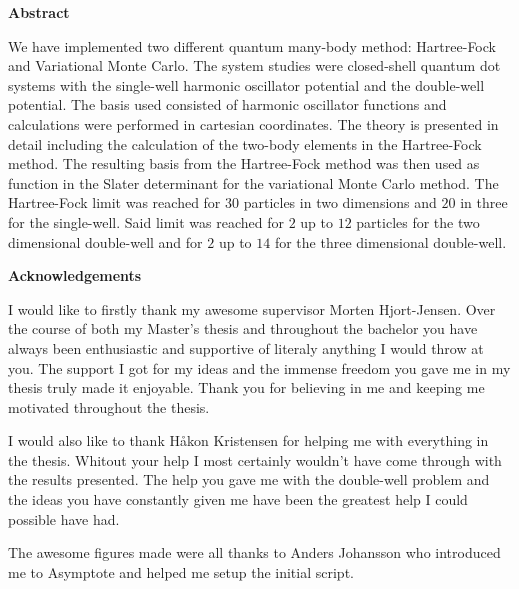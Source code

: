 \newpage
\begin{center}
    \textbf{\Large{Abstract}}\\ \vspace{0.6cm}
\end{center}
    We have implemented two different quantum many-body method: Hartree-Fock
    and Variational Monte Carlo. The system studies were closed-shell quantum
    dot systems with the single-well harmonic oscillator potential and the
    double-well potential. The basis used consisted of harmonic oscillator
    functions and calculations were performed in cartesian coordinates. The
    theory is presented in detail including the calculation of the two-body
    elements in the Hartree-Fock method. The resulting basis from the
    Hartree-Fock method was then used as function in the Slater determinant for
    the variational Monte Carlo method. The Hartree-Fock limit was reached for
    $30$ particles in two dimensions and $20$ in three for the single-well.
    Said limit was reached for $2$ up to $12$ particles for the two dimensional
    double-well and for $2$ up to $14$ for the three dimensional double-well.

\thispagestyle{empty}
\clearpage

\thispagestyle{empty}
\clearpage

\begin{center}
    \textbf{\Large{Acknowledgements}}\\ \vspace{0.6cm}
\end{center}
    I would like to firstly thank my awesome supervisor Morten Hjort-Jensen.
    Over the course of both my Master's thesis and throughout the bachelor you
    have always been enthusiastic and supportive of literaly anything I would
    throw at you. The support I got for my ideas and the immense freedom you
    gave me in my thesis truly made it enjoyable. Thank you for believing in me
    and keeping me motivated throughout the thesis.

    I would also like to thank Håkon Kristensen for helping me with everything
    in the thesis. Whitout your help I most certainly wouldn't have come
    through with the results presented. The help you gave me with the
    double-well problem and the ideas you have constantly given me have been
    the greatest help I could possible have had.

    The awesome figures made were all thanks to Anders Johansson who introduced
    me to Asymptote and helped me setup the initial script.

